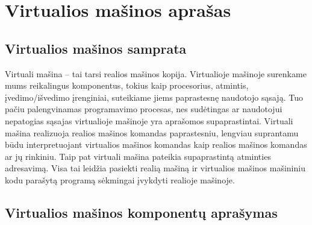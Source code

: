 \section{Virtualios mašinos aprašas}

\subsection{Virtualios mašinos samprata}

Virtuali mašina – tai tarsi realios mašinos kopija. Virtualioje mašinoje
surenkame mums reikalingus komponentus, tokius kaip procesorius,
atmintis, įvedimo/išvedimo įrenginiai, suteikiame jiems paprastesnę
naudotojo sąsają. Tuo pačiu palengvinamas programavimo procesas,
nes sudėtingas ar naudotojui nepatogias sąsajas virtualioje mašinoje yra 
aprašomos supaprastintai. Virtuali mašina realizuoja realios mašinos
komandas paprastesniu, lengviau suprantamu būdu interpretuojant virtualios
mašinos komandas kaip realios mašinos komandas ar jų rinkiniu. Taip pat 
virtuali mašina pateikia supaprastintą atminties adresavimą. Visa tai 
leidžia pasiekti realią mašiną ir virtualios mašinos mašininiu kodu 
parašytą programą sėkmingai įvykdyti realioje mašinoje. 

\subsection{Virtualios mašinos komponentų aprašymas}

